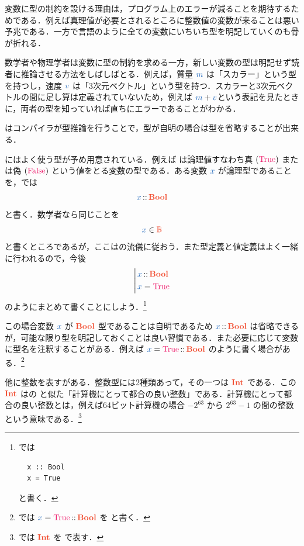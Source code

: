 \documentclass[a5paper,twoside,fleqn,draft]{jsbook}
\begin{document}
変数に型の制約を設ける理由は，プログラム上のエラーが減ることを期待するためである．例えば真理値が必要とされるところに整数値の変数が来ることは悪い予兆である．一方で\clang 言語のように全ての変数にいちいち型を明記していくのも骨が折れる．

数学者や物理学者は変数に型の制約を求める一方，新しい変数の型は明記せず読者に推論させる方法をしばしばとる．例えば，質量 $\mMVar$ は「スカラー」という型を持つし，速度 $\mVVar$ は「3次元ベクトル」という型を持つ．スカラーと3次元ベクトルの間に足し算は定義されていないため，例えば $\mMVar+\mVVar$という表記を見たときに，両者の型を知っていれば直ちにエラーであることがわかる．

\haskell はコンパイラが型推論を行うことで，型が自明の場合は型を省略することが出来る．

\separator

\haskell にはよく使う型が予め用意されている．例えば は論理値すなわち真 $(\hTrue)$ または偽 $(\hFalse)$ という値をとる変数の型である．ある変数 $\hVar{x}$ が論理型であることを，\haskell では
\begin{equation}
  \hVar{x}
  \mIn\mBoolType
\end{equation}
と書く．数学者なら同じことを
\begin{equation}
  \hVar{x}
  \in\mBSet
\end{equation}
と書くところであるが，ここは\haskell の流儀に従おう．また型定義と値定義はよく一緒に行われるので，今後
\begin{equation}
  \left\mBrace
  \begin{aligned}
    \hVar{x}
    &\mIn\mBoolType\\
    \hVar{x}
    &=\hTrue
  \end{aligned}
  \right.
\end{equation}
のようにまとめて書くことにしよう．\footnote{\haskell では
\begin{verbatim}
  x :: Bool
  x = True
\end{verbatim}
と書く．}

この場合変数 $\hVar{x}$ が $\mBoolType$ 型であることは自明であるため $\hVar{x}\mIn\mBoolType$ は省略できるが，可能な限り型を明記しておくことは良い習慣である．また必要に応じて変数に型名を注釈することがある．例えば $\hVar{x}=\hTrue\mIn\mBoolType$ のように書く場合がある．\footnote{\haskell では $\hVar{x}=\hTrue\mIn\mBoolType$ を  と書く．}

他に整数を表すがある．整数型には2種類あって，その一つは $\mIntType$ である．この $\mIntType$ は\clang の  と似た「計算機にとって都合の良い整数」である．計算機にとって都合の良い整数とは，例えば64ビット計算機の場合 $-2^{63}$ から $2^{63}-1$ の間の整数という意味である．\footnote{\haskell では $\mIntType$ を  で表す．}
\end{document}
